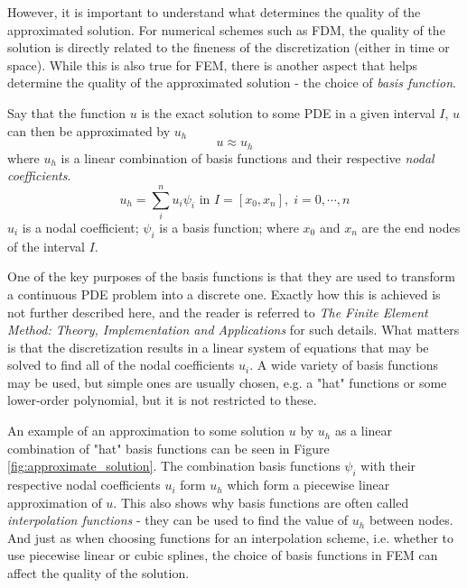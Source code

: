 However, it is important to understand what determines the quality of the approximated solution.
For numerical schemes such as FDM, the quality of the solution is directly related to the fineness of the discretization (either in time or space).
While this is also true for FEM, there is another aspect that helps determine the quality of the approximated solution - the choice of \textit{basis function}.\par

Say that the function $u$ is the exact solution to some PDE in a given interval $I$, $u$ can then be approximated by $u_h$
\begin{equation}
  u \approx u_h
\end{equation}
where $u_h$ is a linear combination of basis functions and their respective \textit{nodal coefficients}.
\begin{equation}
  u_h = \sum^n_i u_i \psi_i \text{ in } I = [x_0, x_n], \; i = 0,\cdots,n
\end{equation}
$u_i$ is a nodal coefficient;
$\psi_i$ is a basis function;
where $x_0$ and $x_n$ are the end nodes of the interval $I$.\par

One of the key purposes of the basis functions is that they are used to transform a continuous PDE problem into a discrete one.
Exactly how this is achieved is not further described here, and the reader is referred to \textit{The Finite Element Method: Theory, Implementation and Applications}\cite{larson_finite_2010} for such details.
What matters is that the discretization results in a linear system of equations that may be solved to find all of the nodal coefficients $u_i$.
A wide variety of basis functions may be used, but simple ones are usually chosen, e.g. a "hat" functions or some lower-order polynomial, but it is not restricted to these.\par

An example of an approximation to some solution $u$ by $u_h$ as a linear combination of "hat" basis functions can be seen in Figure \ref{fig:approximate_solution}.
The combination basis functions $\psi_i$ with their respective nodal coefficients $u_i$ form $u_h$ which form a piecewise linear approximation of $u$.
This also shows why basis functions are often called \textit{interpolation functions} - they can be used to find the value of $u_h$ between nodes.
And just as when choosing functions for an interpolation scheme, i.e. whether to use piecewise linear or cubic splines, the choice of basis functions in FEM can affect the quality of the solution.\par

